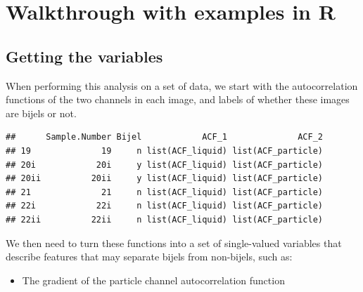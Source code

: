 \documentclass{article}\usepackage[]{graphicx}\usepackage[]{color}
\makeatletter
\newenvironment{kframe}{%
 \def\at@end@of@kframe{}%
 \ifinner\ifhmode%
  \def\at@end@of@kframe{\end{minipage}}%
  \begin{minipage}{\columnwidth}%
 \fi\fi%
 \def\FrameCommand##1{\hskip\@totalleftmargin \hskip-\fboxsep
 \colorbox{shadecolor}{##1}\hskip-\fboxsep
     \hskip-\linewidth \hskip-\@totalleftmargin \hskip\columnwidth}%
 \MakeFramed {\advance\hsize-\width
   \@totalleftmargin\z@ \linewidth\hsize
   \@setminipage}}%
 {\par\unskip\endMakeFramed%
 \at@end@of@kframe}
\newenvironment{knitrout}{}{} %
\makeatother
\begin{document}
\setcounter{section}{5}
\setcounter{page}{5}
\section{Walkthrough with examples in R}

\subsection{Getting the variables}
When performing this analysis on a set of data, we start with the autocorrelation functions of the two channels in each image, and labels of whether these images are bijels or not.

\begin{knitrout}
\color{fgcolor}\begin{kframe}
\begin{verbatim}
##      Sample.Number Bijel            ACF_1              ACF_2
## 19              19     n list(ACF_liquid) list(ACF_particle)
## 20i            20i     y list(ACF_liquid) list(ACF_particle)
## 20ii          20ii     y list(ACF_liquid) list(ACF_particle)
## 21              21     n list(ACF_liquid) list(ACF_particle)
## 22i            22i     n list(ACF_liquid) list(ACF_particle)
## 22ii          22ii     n list(ACF_liquid) list(ACF_particle)
\end{verbatim}
\end{kframe}
\end{knitrout}

We then need to turn these functions into a set of single-valued variables that describe features that may separate bijels from non-bijels, such as:

\begin{itemize}
\item The gradient of the particle channel autocorrelation function
\end{itemize}
\end{document}
